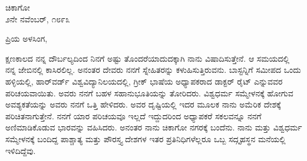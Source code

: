 \begin{flushright}
ಚಿಕಾಗೋ\\೨ನೇ ನವೆಂಬರ್, ೧೮೯೩
\end{flushright}

\noindent
ಪ್ರಿಯ ಅಳಸಿಂಗ,

ಕ್ಷಣಕಾಲದ ನನ್ನ ದೌರ್ಬಲ್ಯದಿಂದ ನಿನಗೆ ಅಷ್ಟು ತೊಂದರೆಯಾದುದಕ್ಕಾಗಿ ನಾನು ವಿಷಾದಿಸುತ್ತೇನೆ. ಆ ಸಮಯದಲ್ಲಿ ನನ್ನ ಜೇಬಿನಲ್ಲಿ ಕಾಸಿರಲಿಲ್ಲ. ಅನಂತರ ದೇವರು ನನಗೆ ಸ್ನೇಹಿತರನ್ನು ಕಳುಹಿಸುತ್ತಿರುವನು. ಬಾಸ್ಟನ್ನಿಗೆ ಸಮೀಪದ ಒಂದು ಹಳ್ಳಿಯಲ್ಲಿ, ಹಾರ್‌ವರ್ಡ್ ವಿಶ್ವವಿದ್ಯಾನಿಲಯದಲ್ಲಿ, ಗ್ರೀಕ್ ಭಾಷೆಯ ಅಧ್ಯಾಪಕರಾದ ಡಾಕ್ಟರ್ ರೈಟ್ ಎನ್ನುವವರ ಪರಿಚಯವಾಯಿತು. ಅವರು ನನಗೆ ಬಹಳ ಸಹಾನುಭೂತಿಯನ್ನು ತೋರಿದರು. ವಿಶ್ವಧರ್ಮ ಸಮ್ಮೇಳನಕ್ಕೆ ಹೋಗುವ ಅವಶ್ಯಕತೆಯನ್ನು ಅವರು ನನಗೆ ಒತ್ತಿ ಹೇಳಿದರು. ಅವರ ದೃಷ್ಟಿಯಲ್ಲಿ ಇದರ ಮೂಲಕ ನಾನು ಅಮೆರಿಕ ದೇಶಕ್ಕೆ ಪರಿಚಿತನಾಗುತ್ತೇನೆ. ನನಗೆ ಯಾರ ಪರಿಚಯವೂ ಇಲ್ಲದೆ ಇದ್ದುದರಿಂದ ಅಧ್ಯಾಪಕರೆ ಸಕಲವನ್ನೂ ನನಗೆ ಅಣಿಮಾಡಿಕೊಡುವ ಭಾರವನ್ನು ವಹಿಸಿದರು. ಅನಂತರ ನಾನು ಚಿಕಾಗೋ ನಗರಕ್ಕೆ ಬಂದೆನು. ನಾನು ಮತ್ತು ವಿಶ್ವಧರ್ಮ ಸಮ್ಮೇಳನಕ್ಕೆ ಬಂದಿದ್ದ ಪಾಶ್ಚಾತ್ಯ ಮತ್ತು ಪೌರಸ್ತ್ಯ ದೇಶಗಳ ಇತರ ಪ್ರತಿನಿಧಿಗಳೆಲ್ಲರೂ ಒಬ್ಬ ಸದ್ಗೃಹಸ್ಥನ ಮನೆಯಲ್ಲಿ ಇಳಿದಿದ್ದೆವು.

